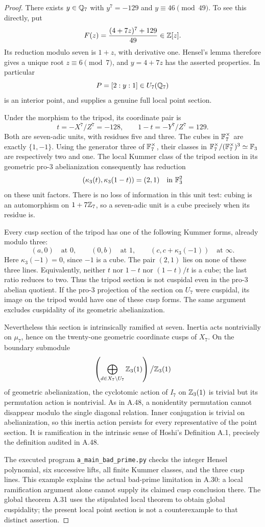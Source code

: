 \begin{proof}
There exists $y\in\mathbb Q_7$ with $y^7=-129$ and
$y\equiv46\pmod{49}$. To see this directly, put
\[
 F(z)=\frac{(4+7z)^7+129}{49}\in\mathbb Z[z].
\]
Its reduction modulo seven is $1+z$, with derivative one. Hensel's
lemma therefore gives a unique root $z\equiv6\pmod7$, and
$y=4+7z$ has the asserted properties. In particular
\[
 P=[2:y:1]\in U_7(\mathbb Q_7)
\]
is an interior point, and supplies a genuine full local point section.

Under the morphism to the tripod, its coordinate pair is
\[
 t=-X^7/Z^7=-128,\qquad 1-t=-Y^7/Z^7=129.
\]
Both are seven-adic units, with residues five and three. The cubes in
$\mathbb F_7^\times$ are exactly $\{1,-1\}$. Using the generator three of
$\mathbb F_7^\times$, their classes in
$\mathbb F_7^\times/(\mathbb F_7^\times)^3\simeq\mathbb F_3$ are respectively two and
one. The local Kummer class of the tripod section in its geometric
pro-$3$ abelianization consequently has reduction
\[
 (\kappa_3(t),\kappa_3(1-t))=(2,1)
 \quad\text{in }\mathbb F_3^2
\]
on these unit factors. There is no loss of information in this unit
test: cubing is an automorphism on $1+7\mathbb Z_7$, so a seven-adic unit is
a cube precisely when its residue is.

Every cusp section of the tripod has one of the following Kummer
forms, already modulo three:
\[
 (a,0)\quad\text{at }0,\qquad
 (0,b)\quad\text{at }1,\qquad
 (c,c+\kappa_3(-1))\quad\text{at }\infty.
\]
Here $\kappa_3(-1)=0$, since $-1$ is a cube. The pair $(2,1)$ lies
on none of these three lines. Equivalently, neither $t$ nor $1-t$
nor $(1-t)/t$ is a cube; the last ratio reduces to two. Thus the
tripod section is not cuspidal even in the pro-$3$ abelian quotient.
If the pro-$3$ projection of the section on $U_7$ were cuspidal, its
image on the tripod would have one of these cusp forms. The same
argument excludes cuspidality of its geometric abelianization.

Nevertheless this section is intrinsically ramified at seven.
Inertia acts nontrivially on $\mu_7$, hence on the twenty-one
geometric coordinate cusps of $X_7$. On the boundary submodule
\[
 \left(\bigoplus_{d\in X_7\setminus U_7}
       \mathbb Z_3(1)\right)\big/\mathbb Z_3(1)
\]
of geometric abelianization, the cyclotomic action of $I_7$ on
$\mathbb Z_3(1)$ is trivial but its permutation action is nontrivial.
As in A.48, a nonidentity permutation cannot disappear modulo the
single diagonal relation. Inner conjugation is trivial on
abelianization, so this inertia action persists for every representative
of the point section. It is ramification in the intrinsic sense of
Hoshi's Definition A.1, precisely the definition audited in A.48.

The executed program \texttt{a\_main\_bad\_prime.py} checks the
integer Hensel polynomial, six successive lifts, all finite Kummer
classes, and the three cusp lines. This example explains the actual
bad-prime limitation in A.30: a local ramification argument alone
cannot supply its claimed cusp conclusion there. The global theorem
A.31 uses the stipulated local theorem to obtain global cuspidality;
the present local point section is not a counterexample to that
distinct assertion.
\end{proof}
